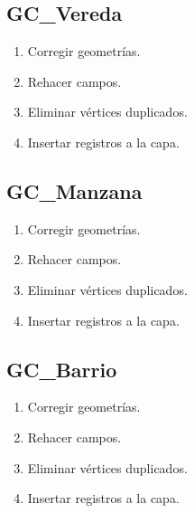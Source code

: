 \documentclass[letterpaper,10pt,spanish]{sphinxmanual}
\begin{document}
\subsection{GC\_Vereda}
\label{\detokenize{ETL_SNC/Model:gc-vereda}}\begin{enumerate}
%
\item {} 
Corregir geometrías.

\item {} 
Rehacer campos.

\item {} 
Eliminar vértices duplicados.

\item {} 
Insertar registros a la capa.


\end{enumerate}


\subsection{GC\_Manzana}
\label{\detokenize{ETL_SNC/Model:gc-manzana}}\begin{enumerate}
%
\item {} 
Corregir geometrías.

\item {} 
Rehacer campos.

\item {} 
Eliminar vértices duplicados.

\item {} 
Insertar registros a la capa.


\end{enumerate}


\subsection{GC\_Barrio}
\label{\detokenize{ETL_SNC/Model:gc-barrio}}\begin{enumerate}
%
\item {} 
Corregir geometrías.

\item {} 
Rehacer campos.

\item {} 
Eliminar vértices duplicados.

\item {} 
Insertar registros a la capa.


\end{enumerate}
\end{document}
